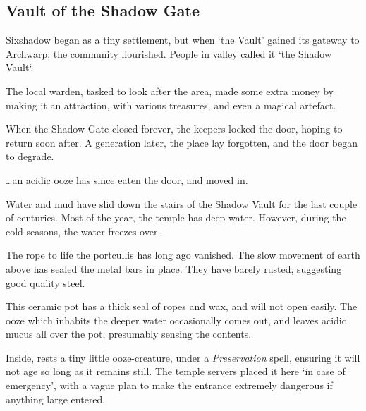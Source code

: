 \subsection{Vault of the Shadow Gate}

\begin{exampletext}
  Sixshadow began as a tiny settlement, but when `the Vault' gained its gateway to Archwarp, the community flourished.
  People in \gls{valley} called it `the Shadow Vault`.

  The local \gls{warden}, tasked to look after the area, made some extra money by making it an attraction, with various treasures, and even a magical \gls{artefact}.

  When the Shadow Gate closed forever, the keepers locked the door, hoping to return soon after.
  A generation later, the place lay forgotten, and the door began to degrade.

  \ldots an acidic ooze has since eaten the door, and moved in.
\end{exampletext}

Water and mud have slid down the stairs of the Shadow Vault for the last couple of centuries.
Most of the year, the temple has deep water.
However, during the cold seasons, the water freezes over.


The rope to life the portcullis has long ago vanished.
The slow movement of earth above has sealed the metal bars in place.
They have barely rusted, suggesting good quality steel.



This ceramic pot has a thick seal of ropes and wax, and will not open easily.
The ooze which inhabits the deeper water  occasionally comes out, and leaves acidic mucus all over the pot, presumably sensing the contents.

Inside, rests a tiny little ooze-creature, under a \textit{Preservation} spell, ensuring it will not age so long as it remains still.
The temple \glspl{server} placed it here `in case of emergency', with a vague plan to make the entrance extremely dangerous if anything large entered.


